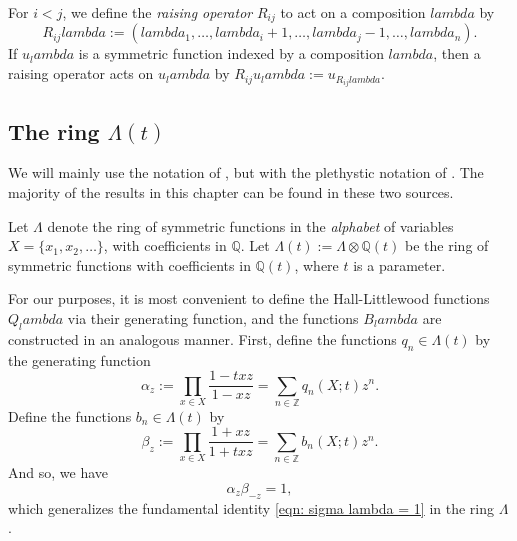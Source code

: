 \documentclass[12pt]{amsart}%
\def\lambda{lambda}%
\theoremstyle{remark}
\theoremstyle{definition}
\newcommand{\Z}{\mathbb{Z}}
\newcommand{\Q}{\mathbb{Q}}
\newcommand{\ox}{\otimes}
\begin{document}
    For $i<j$, we define the \emph{raising operator} $R_{ij}$ to act on a composition $\lambda$ by
    \[R_{ij}\lambda:=(\lambda_1,\ldots,\lambda_i+1,\ldots,\lambda_j-1,\ldots,\lambda_n).\]
    If $u_\lambda$ is a symmetric function indexed by a composition $\lambda$, then a raising operator acts on $u_\lambda$ by $R_{ij}u_\lambda:=u_{R_{ij}\lambda}$.

    \subsection{The ring $\Lambda(t)$}

    We will mainly use the notation of \cite{macdonald:1995}, but with the plethystic notation of \cite{lascoux:2003}. The majority of the results in this chapter can be found in these two sources.
    
    Let $\Lambda$ denote the ring of symmetric functions in the \emph{alphabet} of variables $X=\{x_1,x_2,\ldots\}$, with coefficients in $\Q$. Let $\Lambda(t):=\Lambda\ox\Q(t)$ be the ring of symmetric functions with coefficients in $\Q(t)$, where $t$ is a parameter. 

    For our purposes, it is most convenient to define the Hall-Littlewood functions $Q_\lambda$ via their generating function, and the functions $B_\lambda$ are constructed in an analogous manner. First, define the functions $q_n\in\Lambda(t)$ by the generating function
    \begin{equation}
        \alpha_z:=\prod_{x\in X}\frac{1-txz}{1-xz}=\sum_{n\in\Z}q_n(X;t)z^n.
    \end{equation}
    Define the functions $b_n\in\Lambda(t)$ by
    \begin{equation}
        \beta_z:=\prod_{x\in X}\frac{1+xz}{1+txz}=\sum_{n\in\Z}b_n(X;t)z^n.
    \end{equation}
    And so, we have
    \begin{equation}\label{eqn: alpha_z=beta_-z^-1}
        \alpha_z\beta_{-z}=1,
    \end{equation}
    which generalizes the fundamental identity \eqref{eqn: sigma lambda = 1} in the ring $\Lambda$.
\end{document}
